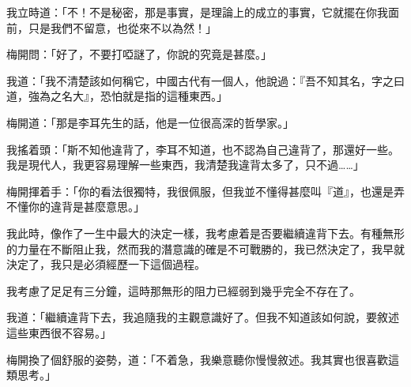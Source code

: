 我立時道：「不！不是秘密，那是事實，是理論上的成立的事實，它就擺在你我面前，只是我們不留意，也從來不以為然！」

梅開問：「好了，不要打啞謎了，你說的究竟是甚麼。」

我道：「我不清楚該如何稱它，中國古代有一個人，他說過：『吾不知其名，字之曰道，強為之名大』，恐怕就是指的這種東西。」

梅開道：「那是李耳先生的話，他是一位很高深的哲學家。」

我搖着頭：「斯不知他違背了，李耳不知道，也不認為自己違背了，那還好一些。我是現代人，我更容易理解一些東西，我清楚我違背太多了，只不過……」

梅開揮着手：「你的看法很獨特，我很佩服，但我並不懂得甚麼叫『道』，也還是弄不懂你的違背是甚麼意思。」

我此時，像作了一生中最大的決定一樣，我考慮着是否要繼續違背下去。有種無形的力量在不斷阻止我，然而我的潛意識的確是不可戰勝的，我已然決定了，我早就決定了，我只是必須經歷一下這個過程。

我考慮了足足有三分鐘，這時那無形的阻力已經弱到幾乎完全不存在了。

我道：「繼續違背下去，我追隨我的主觀意識好了。但我不知道該如何說，要敘述這些東西很不容易。」

梅開換了個舒服的姿勢，道：「不着急，我樂意聽你慢慢敘述。我其實也很喜歡這類思考。」


